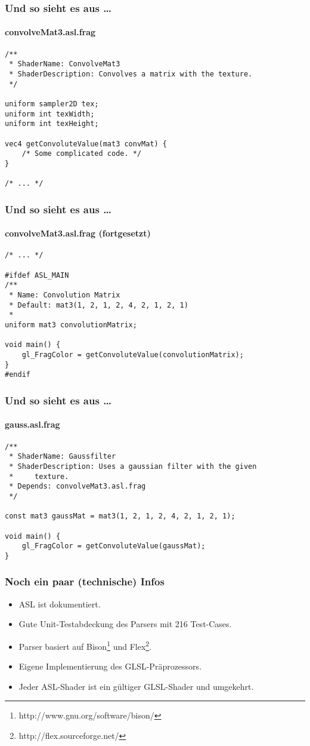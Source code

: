 \documentclass{beamer}
\begin{document}
\begin{frame}[fragile]
    \frametitle{Und so sieht es aus \dots }
    \framesubtitle{convolveMat3.asl.frag}
    \begin{lstlisting}
/**
 * ShaderName: ConvolveMat3
 * ShaderDescription: Convolves a matrix with the texture.
 */

uniform sampler2D tex;
uniform int texWidth;
uniform int texHeight;

vec4 getConvoluteValue(mat3 convMat) {
    /* Some complicated code. */
}

/* ... */
    \end{lstlisting}
\end{frame}
\begin{frame}[fragile]
    \frametitle{Und so sieht es aus \dots }
    \framesubtitle{convolveMat3.asl.frag (fortgesetzt)}
    \begin{lstlisting}
/* ... */

#ifdef ASL_MAIN
/**
 * Name: Convolution Matrix
 * Default: mat3(1, 2, 1, 2, 4, 2, 1, 2, 1)
 *
uniform mat3 convolutionMatrix;

void main() {
    gl_FragColor = getConvoluteValue(convolutionMatrix);
}
#endif
     \end{lstlisting}
\end{frame}
\begin{frame}[fragile]
    \frametitle{Und so sieht es aus \dots }
    \framesubtitle{gauss.asl.frag}
    \begin{lstlisting}
/**
 * ShaderName: Gaussfilter
 * ShaderDescription: Uses a gaussian filter with the given
 *     texture.
 * Depends: convolveMat3.asl.frag
 */

const mat3 gaussMat = mat3(1, 2, 1, 2, 4, 2, 1, 2, 1);

void main() {
    gl_FragColor = getConvoluteValue(gaussMat);
}
     \end{lstlisting}
\end{frame}

\begin{frame}
    \frametitle{Noch ein paar (technische) Infos}
    \begin{itemize}
        \item ASL ist dokumentiert.
        \item Gute Unit-Testabdeckung des Parsers mit 216 Test-Cases.
        \item Parser basiert auf Bison\footnote{http://www.gnu.org/software/bison/}
             und Flex\footnote{http://flex.sourceforge.net/}.
        \item Eigene Implementierung des GLSL-Präprozessors.
        \item Jeder ASL-Shader ist ein gültiger GLSL-Shader und umgekehrt.
    \end{itemize}
\end{frame}
\end{document}
